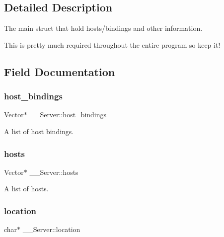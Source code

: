 \subsection{Detailed Description}
The main struct that hold hosts/bindings and other information. 

This is pretty much required throughout the entire program so keep it! 

\subsection{Field Documentation}
\mbox{\label{struct_____server_a389d7a5fe24d9711632aabfed1c37ae3}} 
\subsubsection{\texorpdfstring{host\+\_\+bindings}{host\_bindings}}
{\footnotesize\ttfamily Vector$\ast$ \+\_\+\+\_\+\+Server\+::host\+\_\+bindings}



A list of host bindings. 

\mbox{\label{struct_____server_aa3be8ce9854d670e8d998ed3447d95ee}} 
\subsubsection{\texorpdfstring{hosts}{hosts}}
{\footnotesize\ttfamily Vector$\ast$ \+\_\+\+\_\+\+Server\+::hosts}



A list of hosts. 

\mbox{\label{struct_____server_a34c1fd64941cff2faede91f79ebee8ec}} 
\subsubsection{\texorpdfstring{location}{location}}
{\footnotesize\ttfamily char$\ast$ \+\_\+\+\_\+\+Server\+::location}



